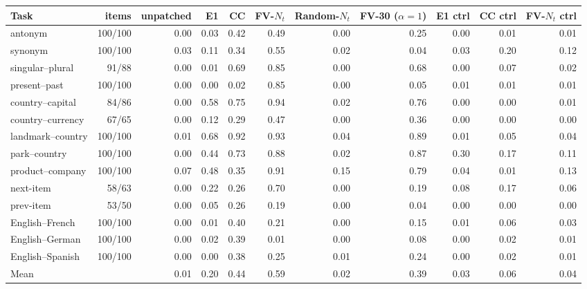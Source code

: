 \begin{tabular}{lrrrrrrrrrr}
\toprule
Task & items & unpatched & E1 & CC & FV-$N_t$ & Random-$N_t$ & FV-30 ($\alpha{=}1$) & E1 ctrl & CC ctrl & FV-$N_t$ ctrl \\
\midrule
antonym & 100/100 & 0.00 & 0.03 & 0.42 & 0.49 & 0.00 & 0.25 & 0.00 & 0.01 & 0.01 \\
synonym & 100/100 & 0.03 & 0.11 & 0.34 & 0.55 & 0.02 & 0.04 & 0.03 & 0.20 & 0.12 \\
singular--plural & 91/88 & 0.00 & 0.01 & 0.69 & 0.85 & 0.00 & 0.68 & 0.00 & 0.07 & 0.02 \\
present--past & 100/100 & 0.00 & 0.00 & 0.02 & 0.85 & 0.00 & 0.05 & 0.01 & 0.01 & 0.01 \\
country--capital & 84/86 & 0.00 & 0.58 & 0.75 & 0.94 & 0.02 & 0.76 & 0.00 & 0.00 & 0.01 \\
country--currency & 67/65 & 0.00 & 0.12 & 0.29 & 0.47 & 0.00 & 0.36 & 0.00 & 0.00 & 0.00 \\
landmark--country & 100/100 & 0.01 & 0.68 & 0.92 & 0.93 & 0.04 & 0.89 & 0.01 & 0.05 & 0.04 \\
park--country & 100/100 & 0.00 & 0.44 & 0.73 & 0.88 & 0.02 & 0.87 & 0.30 & 0.17 & 0.11 \\
product--company & 100/100 & 0.07 & 0.48 & 0.35 & 0.91 & 0.15 & 0.79 & 0.04 & 0.01 & 0.13 \\
next-item & 58/63 & 0.00 & 0.22 & 0.26 & 0.70 & 0.00 & 0.19 & 0.08 & 0.17 & 0.06 \\
prev-item & 53/50 & 0.00 & 0.05 & 0.26 & 0.19 & 0.00 & 0.04 & 0.00 & 0.00 & 0.00 \\
English--French & 100/100 & 0.00 & 0.01 & 0.40 & 0.21 & 0.00 & 0.15 & 0.01 & 0.06 & 0.03 \\
English--German & 100/100 & 0.00 & 0.02 & 0.39 & 0.01 & 0.00 & 0.08 & 0.00 & 0.02 & 0.01 \\
English--Spanish & 100/100 & 0.00 & 0.00 & 0.38 & 0.25 & 0.01 & 0.24 & 0.00 & 0.02 & 0.01 \\
\midrule
Mean &  & 0.01 & 0.20 & 0.44 & 0.59 & 0.02 & 0.39 & 0.03 & 0.06 & 0.04 \\
\bottomrule
\end{tabular}
